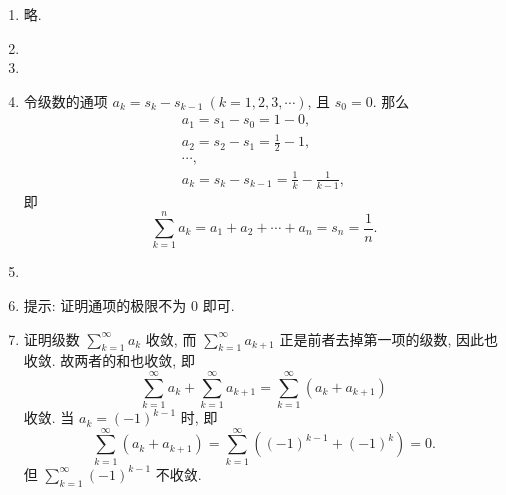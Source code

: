 \documentclass[a4paper, 11pt]{ctexart}
\begin{document}
\begin{enumerate}
    \item %
        略.
    \item %
    \item %
    \item %
        令级数的通项 $a_k = s_{k} - s_{k-1}\ (k = 1, 2, 3, \cdots)$, 且 $s_0 = 0$. 那么
        \begin{gather*}
            a_1 = s_1 - s_0 = 1 - 0, \\
            a_2 = s_2 - s_1 = \frac12 - 1, \\
            \cdots, \\
            a_k = s_k - s_{k-1} = \frac{1}{k} - \frac{1}{k - 1},
        \end{gather*}
        即
        \[
            \sum_{k=1}^n a_k = a_1 + a_2 + \cdots + a_n = s_n = \frac{1}{n}.    
        \]
    \item %
    \item %
        提示: 证明通项的极限不为 $0$ 即可.
    \item %
        {\heiti 证明}\quad 级数 $\sum\limits_{k=1}^\infty a_k$ 收敛, 而 $\sum\limits_{k=1}^\infty a_{k+1}$ 正是前者去掉第一项的级数, 因此也收敛.
        故两者的和也收敛, 即
        \[
            \sum_{k=1}^\infty a_k + \sum_{k=1}^\infty a_{k+1} = \sum_{k=1}^\infty(a_k + a_{k+1})    
        \]
        收敛. 当 $a_k = (-1)^{k-1}$ 时, 即
        \[
            \sum_{k=1}^\infty(a_k + a_{k+1}) = \sum_{k=1}^\infty((-1)^{k-1} + (-1)^{k}) = 0.    
        \]
        但 $\sum\limits_{k=1}^\infty (-1)^{k-1}$ 不收敛.


\end{enumerate}
\end{document}
